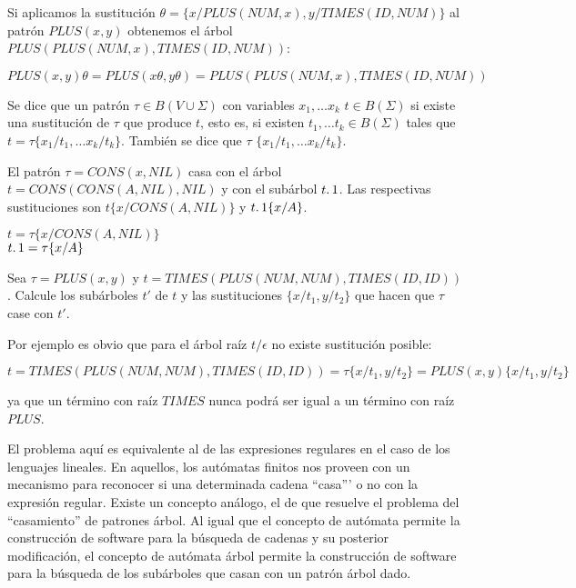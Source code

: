 \begin{example}
Si aplicamos la sustitución  $\theta = \{x/PLUS(NUM, x), y/TIMES(ID, NUM)\}$
al patrón $PLUS(x, y)$ obtenemos el árbol $PLUS(PLUS(NUM,x), TIMES(ID, NUM))$:

\begin{center}
$PLUS(x, y)\theta = PLUS(x\theta, y\theta) = PLUS(PLUS(NUM,x), TIMES(ID, NUM))$
\end{center}

\end{example}

\begin{definition}
Se dice que un patrón $\tau \in B(V \cup \Sigma)$ con variables
$x_1, \ldots x_k$ 
$t \in B(\Sigma)$ si existe una sustitución de $\tau$ que produce $t$, esto
es, si existen $t_1, \ldots t_k \in B(\Sigma)$ tales que 
$t = \tau \{x_1/t_1, \ldots x_k/t_k\}$. 
También se dice que $\tau$ 
$\{x_1/t_1, \ldots x_k/t_k\}$.
\end{definition}

\begin{example}
El patrón $\tau = CONS(x, NIL)$ casa con el árbol $t = CONS(CONS(A,NIL),NIL)$ 
y con el subárbol  $t \ldotp 1$. Las respectivas sustituciones son $t\{x/CONS(A,NIL)\}$ y 
$t \ldotp 1 \{x/A\}$.

\begin{center}
$t = \tau \{x/CONS(A,NIL)\}$\\
$t \ldotp 1 = \tau \{x/A\}$
\end{center}

\end{example}

\begin{exercise}
Sea $\tau = PLUS(x, y)$ y $t = TIMES(PLUS(NUM, NUM), TIMES(ID, ID))$.
Calcule los subárboles $t'$ de $t$ y las sustituciones $\{x/t_1, y/t_2\}$ 
que hacen que $\tau$ case con $t'$.  

Por ejemplo es obvio que para el árbol raíz $t/\epsilon$ no existe sustitución
posible:

$t = TIMES(PLUS(NUM, NUM), TIMES(ID, ID)) = \tau\{x/t_1, y/t_2\} =
PLUS(x, y)\{x/t_1, y/t_2\}$

ya que un término con raíz $TIMES$ nunca podrá ser igual a un término con raíz 
$PLUS$.
\end{exercise}

El problema aquí es equivalente al de las expresiones regulares
en el caso de los lenguajes lineales. En aquellos, los autómatas finitos 
nos proveen con un mecanismo para reconocer si una determinada cadena
``casa''' o no con la expresión regular. Existe un concepto análogo,
el de  que resuelve el problema del ``casamiento''
de patrones árbol. Al igual que el concepto de autómata permite 
la construcción de software para la búsqueda de cadenas y su 
posterior modificación, el concepto de autómata árbol 
permite la construcción de software para la búsqueda de los
subárboles que casan con un patrón árbol dado.

